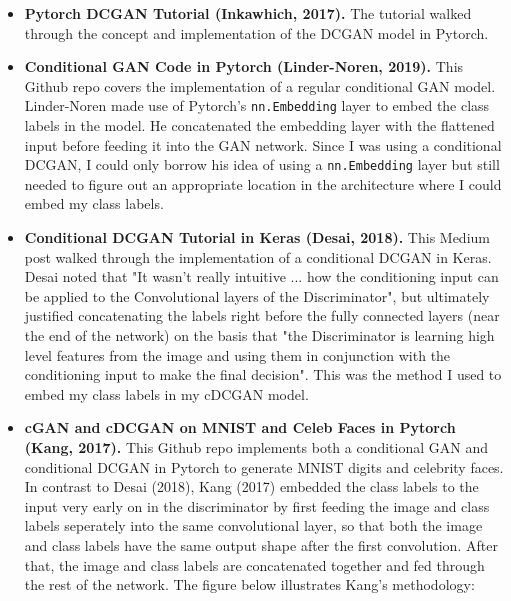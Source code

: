 \documentclass[11pt]{article}
\begin{document}
\begin{itemize}
\item
  \textbf{Pytorch DCGAN Tutorial (Inkawhich, 2017).} The tutorial walked
  through the concept and implementation of the DCGAN model in Pytorch.
\item
  \textbf{Conditional GAN Code in Pytorch (Linder-Noren, 2019).} This
  Github repo covers the implementation of a regular conditional GAN
  model. Linder-Noren made use of Pytorch's \texttt{nn.Embedding} layer
  to embed the class labels in the model. He concatenated the embedding
  layer with the flattened input before feeding it into the GAN network.
  Since I was using a conditional DCGAN, I could only borrow his idea of
  using a \texttt{nn.Embedding} layer but still needed to figure out an
  appropriate location in the architecture where I could embed my class
  labels.
\item
  \textbf{Conditional DCGAN Tutorial in Keras (Desai, 2018).} This
  Medium post walked through the implementation of a conditional DCGAN
  in Keras. Desai noted that "It wasn't really intuitive ... how the
  conditioning input can be applied to the Convolutional layers of the
  Discriminator", but ultimately justified concatenating the labels
  right before the fully connected layers (near the end of the network)
  on the basis that "the Discriminator is learning high level features
  from the image and using them in conjunction with the conditioning
  input to make the final decision". This was the method I used to embed
  my class labels in my cDCGAN model.
\item
  \textbf{cGAN and cDCGAN on MNIST and Celeb Faces in Pytorch (Kang,
  2017).} This Github repo implements both a conditional GAN and
  conditional DCGAN in Pytorch to generate MNIST digits and celebrity
  faces. In contrast to Desai (2018), Kang (2017) embedded the class
  labels to the input very early on in the discriminator by first
  feeding the image and class labels seperately into the same
  convolutional layer, so that both the image and class labels have the
  same output shape after the first convolution. After that, the image
  and class labels are concatenated together and fed through the rest of
  the network. The figure below illustrates Kang's methodology:
\end{itemize}

    \begin{center}
    \end{center}
\end{document}
